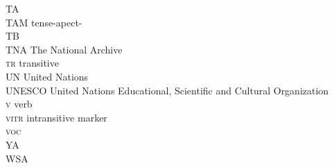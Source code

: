 \begin{refsection}
\begin{multicols}{2}
\begin{tabbing}
TA \>   \\
TAM \> tense-apect- \\
TB \>   \\
TNA \> The National Archive \\
\textsc{tr} \> transitive \\
UN \> United Nations \\
UNESCO \> United Nations Educational, Scientific and Cultural Organization \\
\textsc{v} \> verb \\
\textsc{vitr} \> intransitive marker \\
\textsc{voc} \>  \\
YA \>   \\
WSA \>    \\
          \>  \\
\end{tabbing}
\end{multicols}
\end{refsection}